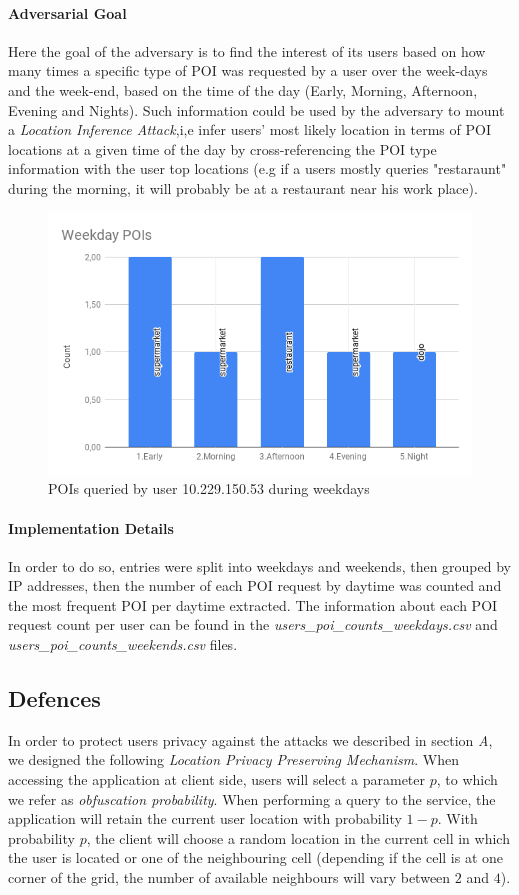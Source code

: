 \documentclass[10pt,conference,compsocconf]{IEEEtran}
\begin{document}
\paragraph{Adversarial Goal}
Here the goal of the adversary is to find the interest of its users based on how many times a specific
type of POI was requested by a user over the week-days and the week-end, based on the time of the day (Early, Morning, Afternoon, Evening and Nights).
Such information could be used by the adversary to mount a \textit{Location Inference Attack},i,e infer  users' most likely location in terms of POI locations at a given time of the
day by cross-referencing the POI type information with the user top locations (e.g if a users mostly queries "restaraunt" during the morning, it will probably be at a restaurant near his work place).
\begin{figure}
    \centering
    \includegraphics[width=0.6\linewidth]{10.229.150.53_pois.png}
    \caption{POIs queried by user 10.229.150.53 during weekdays}
    \label{fig:my_label}
\end{figure}
\paragraph{Implementation Details}
In order to do so, entries were split into weekdays and weekends, then grouped by IP addresses, then the number of each POI request by daytime was counted and the most frequent POI per daytime extracted.
The information about each POI request count per user can be found in the \textit{users\_poi\_counts\_weekdays.csv}
and \textit{users\_poi\_counts\_weekends.csv} files.

\subsection{Defences}
In order to protect users privacy against the attacks we described in section
\textit{A}, we designed the following \textit{Location Privacy Preserving
Mechanism}. When accessing the application at client side, users will select a
parameter $p$, to which we refer as \textit{obfuscation probability}. When
performing a query to the service, the application will retain the current user
location with probability $1-p$. With probability $p$, the client will choose a
random location in the current cell in which the user is located or one of the
neighbouring cell (depending if the cell is at one corner of the grid, the
number of available neighbours will vary between $2$ and $4$).
\end{document}
